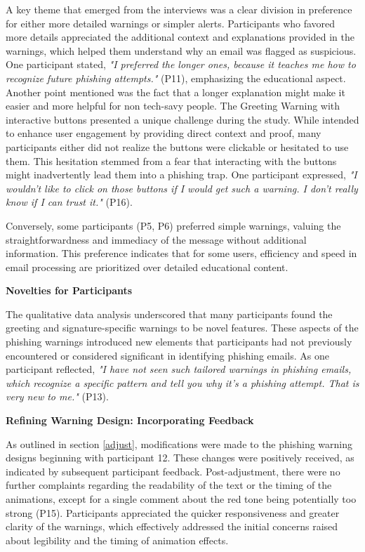\documentclass[
  a4paper,  %
  twoside,  %
  bibliography=totoc,
  headsepline,
  cleardoublepage=empty,
  parskip=half,
  draft=false
]{scrbook}
\begin{document}
A key theme that emerged from the interviews was a clear division in preference for either more detailed warnings or simpler alerts. Participants who favored more details appreciated the additional context and explanations provided in the warnings, which helped them understand why an email was flagged as suspicious. One participant stated, \textit{"I preferred the longer ones, because it teaches me how to recognize future phishing attempts."} (P11), emphasizing the educational aspect. Another point mentioned was the fact that a longer explanation might make it easier and more helpful for non tech-savy people. The Greeting Warning with interactive buttons presented a unique challenge during the study. While intended to enhance user engagement by providing direct context and proof, many participants either did not realize the buttons were clickable or hesitated to use them. This hesitation stemmed from a fear that interacting with the buttons might inadvertently lead them into a phishing trap. One participant expressed, \textit{"I wouldn’t like to click on those buttons if I would get such a warning. I don’t really know if I can trust it."} (P16). \par
Conversely, some participants (P5, P6) preferred simple warnings, valuing the straightforwardness and immediacy of the message without additional information. This preference indicates that for some users, efficiency and speed in email processing are prioritized over detailed educational content. 

\textbf{Novelties for Participants}

The qualitative data analysis underscored that many participants found the greeting and signature-specific warnings to be novel features. These aspects of the phishing warnings introduced new elements that participants had not previously encountered or considered significant in identifying phishing emails. As one participant reflected, \textit{"I have not seen such tailored warnings in phishing emails, which recognize a specific pattern and tell you why it's a phishing attempt. That is very new to me."} (P13). \newpage

\textbf{Refining Warning Design: Incorporating Feedback}

As outlined in section \ref{adjust}, modifications were made to the phishing warning designs beginning with participant 12. 
These changes were positively received, as indicated by subsequent participant feedback. Post-adjustment, there were no further complaints regarding the readability of the text or the timing of the animations, except for a single comment about the red tone being potentially too strong (P15). Participants appreciated the quicker responsiveness and greater clarity of the warnings, which effectively addressed the initial concerns raised about legibility and the timing of animation effects. 
\end{document}
